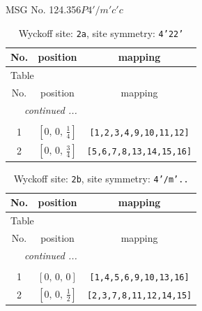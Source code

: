\documentclass[fleqn,8pt]{jsarticle}
\begin{document}
\setcounter{MaxMatrixCols}{32}

\renewcommand{\tablename}{Table~}
\renewcommand{\figurename}{Figure~}
\begin{center}
\LARGE
MSG No. 124.356\quad$P4'/m'c'c$
\end{center}
\renewcommand{\arraystretch}{1.2}
\begin{longtable}{ccc}
\caption{Wyckoff site: {\tt 2a}, site symmetry: {\tt 4'22'}}
 \\
 \hline \hline
No. & position & mapping \\ \hline \endfirsthead

\multicolumn{2}{l}{\tablename\ \thetable{}} \\
 \hline \hline
No. & position & mapping \\ \hline \endhead

 \hline \hline
\multicolumn{2}{r}{\footnotesize\it continued ...} \\ \endfoot

 \hline \hline
\multicolumn{2}{r}{} \\ \endlastfoot

1 & $\left[ 0,\, 0,\, \frac{1}{4} \right]$ & {\tt [1,2,3,4,9,10,11,12]} \\ \hline
2 & $\left[ 0,\, 0,\, \frac{3}{4} \right]$ & {\tt [5,6,7,8,13,14,15,16]} \\
\end{longtable}
\renewcommand{\arraystretch}{1.2}
\begin{longtable}{ccc}
\caption{Wyckoff site: {\tt 2b}, site symmetry: {\tt 4'/m'..}}
 \\
 \hline \hline
No. & position & mapping \\ \hline \endfirsthead

\multicolumn{2}{l}{\tablename\ \thetable{}} \\
 \hline \hline
No. & position & mapping \\ \hline \endhead

 \hline \hline
\multicolumn{2}{r}{\footnotesize\it continued ...} \\ \endfoot

 \hline \hline
\multicolumn{2}{r}{} \\ \endlastfoot

1 & $\left[ 0,\, 0,\, 0 \right]$ & {\tt [1,4,5,6,9,10,13,16]} \\ \hline
2 & $\left[ 0,\, 0,\, \frac{1}{2} \right]$ & {\tt [2,3,7,8,11,12,14,15]} \\
\end{longtable}
\end{document}
